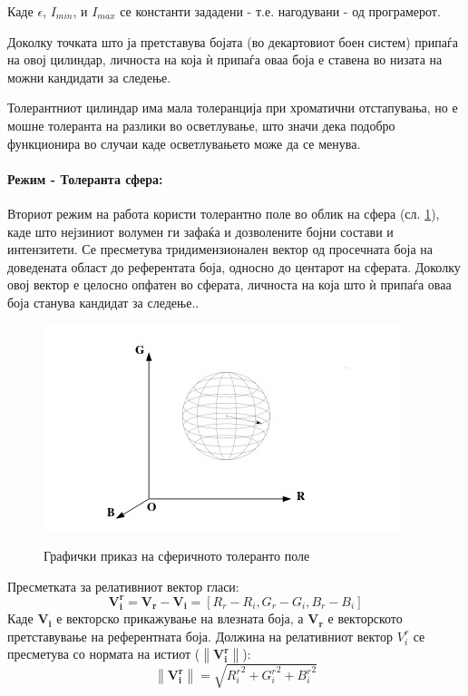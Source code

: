 \documentclass[11pt]{article}
\newcommand\norm[1]{\left\lVert#1\right\rVert}
\renewcommand{\vec}[1]{\mathbf{#1}}
\begin{document}
        Каде $\epsilon$, $I_{min}$, и $I_{max}$ се константи зададени - т.е. нагодувани - од програмерот.

        Доколку точката што ја претставува бојата (во декартовиот боен систем) припаѓа на овој цилиндар, личноста на која ѝ припаѓа оваа боја е ставена во низата на можни кандидати за следење.

        Толерантниот цилиндар има мала толеранција при хроматични отстапувања, но е мошне толеранта на разлики во осветлување, што значи дека подобро функционира во случаи каде осветлувањето може да се менува.

      \paragraph{Режим - Толеранта сфера:\\}
        Вториот режим на работа користи толерантно поле во облик на сфера (сл. \ref{fig:sphere}), каде што нејзиниот волумен ги зафаќа и дозволените бојни состави и интензитети. Се пресметува тридимензионален вектор од просечната боја на доведената област до референтата боја, односно до центарот на сферата. Доколку овој вектор е целосно опфатен во сферата, личноста на која што ѝ припаѓа оваа боја станува кандидат за следење..
        \begin{figure}[h]
          \centering
          \includegraphics[width = 0.6\linewidth]{./images/sphere.png}
          \label{fig:sphere}
          \caption{Графички приказ на сферичното толеранто поле}
        \end{figure}
        Пресметката за релативниот вектор гласи:
        \begin{equation}
          \vec{V_i^r} = \vec{V_r} - \vec{V_i}= [R_r - R_i, G_r - G_i, B_r - B_i]
        \end{equation}
        Каде $\vec{V_i}$ е векторско прикажување на влезната боја, а $\vec{V_r}$ е векторското претставување на референтната боја.
        Должина на релативниот вектор $V_i^r$ се пресметува со нормата на истиот ($\norm{\vec{V_i^r}}$):
        \begin{equation}
        \norm{\vec{V_i^r}} = \sqrt{{R_i^r}^2 + {G_i^r}^2 + {B_i^r}^2}
        \end{equation}
\end{document}
